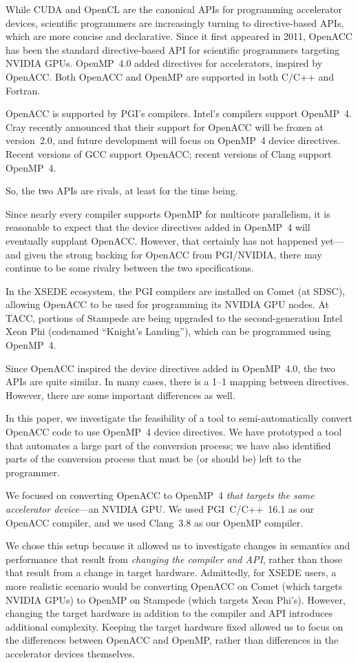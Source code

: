 \documentclass{sig-alternate-05-2015}
\begin{document}
While CUDA and OpenCL are the canonical APIs for programming accelerator
devices, scientific programmers are increasingly turning to directive-based
APIs, which are more concise and declarative.  Since it first appeared in 2011,
OpenACC has been the standard directive-based API for scientific programmers
targeting NVIDIA GPUs.  OpenMP~4.0 added directives for accelerators, inspired
by OpenACC\@.  Both OpenACC and OpenMP are supported in both C/C++ and Fortran.

OpenACC is supported by PGI's compilers.  Intel's compilers support OpenMP~4.
Cray recently announced that their support for OpenACC will be frozen at
version~2.0, and future development will focus on OpenMP~4 device directives.
Recent versions of GCC support OpenACC; recent versions of Clang support
OpenMP~4.

So, the two APIs are rivals, at least for the time being.

Since nearly every compiler supports OpenMP for multicore parallelism, it is
reasonable to expect that the device directives added in OpenMP~4 will
eventually supplant OpenACC\@.  However, that certainly has not happened
yet---and given the strong backing for OpenACC from PGI/NVIDIA, there may
continue to be some rivalry between the two specifications.

In the XSEDE ecosystem, the PGI compilers are installed on Comet (at SDSC),
allowing OpenACC to be used for programming its NVIDIA GPU nodes.  At TACC,
portions of Stampede are being upgraded to the second-generation Intel Xeon Phi
(codenamed ``Knight's Landing''), which can be programmed using OpenMP~4.

Since OpenACC inspired the device directives added in OpenMP~4.0, the two APIs
are quite similar.  In many cases, there is a 1--1 mapping between directives.
However, there are some important differences as well.

In this paper, we investigate the feasibility of a tool to semi-automatically
convert OpenACC code to use OpenMP~4 device directives.  We have prototyped a
tool that automates a large part of the conversion process; we have also
identified parts of the conversion process that must be (or should be) left to
the programmer.

We focused on converting OpenACC to OpenMP~4 \emph{that targets the same
accelerator device}---an NVIDIA GPU.  We used PGI~C/C++~16.1 as our OpenACC
compiler, and we used Clang~3.8 as our OpenMP compiler.

We chose this setup because it allowed us to investigate changes in semantics
and performance that result from \emph{changing the compiler and API}, rather
than those that result from a change in target hardware.  Admittedly, for XSEDE
users, a more realistic scenario would be converting OpenACC on Comet (which
targets NVIDIA GPUs) to OpenMP on Stampede (which targets Xeon Phi's).
However, changing the target hardware in addition to the compiler and API
introduces additional complexity.  Keeping the target hardware fixed allowed us
to focus on the differences between OpenACC and OpenMP, rather than differences
in the accelerator devices themselves.
\end{document}
